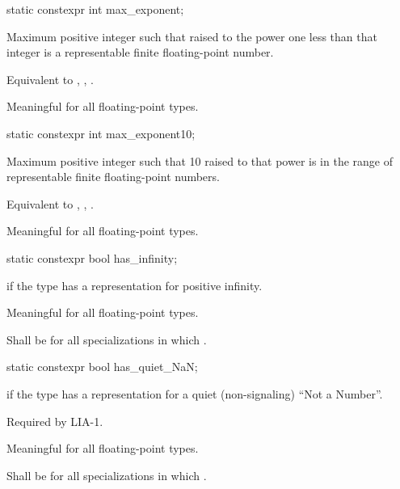 %
\begin{itemdecl}
static constexpr int  max_exponent;
\end{itemdecl}

\begin{itemdescr}
\pnum
Maximum positive integer such that
raised to the power one less than that integer is a representable finite
floating-point number.
\begin{footnote}
Equivalent to ,
, .
\end{footnote}

\pnum
Meaningful for all floating-point types.
\end{itemdescr}

%
\begin{itemdecl}
static constexpr int  max_exponent10;
\end{itemdecl}

\begin{itemdescr}
\pnum
Maximum positive integer such that 10 raised to that power is in the
range of representable finite floating-point numbers.
\begin{footnote}
Equivalent to
, , .
\end{footnote}

\pnum
Meaningful for all floating-point types.
\end{itemdescr}

%
\begin{itemdecl}
static constexpr bool has_infinity;
\end{itemdecl}

\begin{itemdescr}
\pnum
{} if the type has a representation for positive infinity.

\pnum
Meaningful for all floating-point types.

\pnum
Shall be
for all specializations in which
.
\end{itemdescr}

%
\begin{itemdecl}
static constexpr bool has_quiet_NaN;
\end{itemdecl}

\begin{itemdescr}
\pnum
{} if the type has a representation for a quiet (non-signaling) ``Not a
Number''.
\begin{footnote}
Required by LIA-1.
\end{footnote}

\pnum
Meaningful for all floating-point types.

\pnum
Shall be
for all specializations in which
.
\end{itemdescr}

